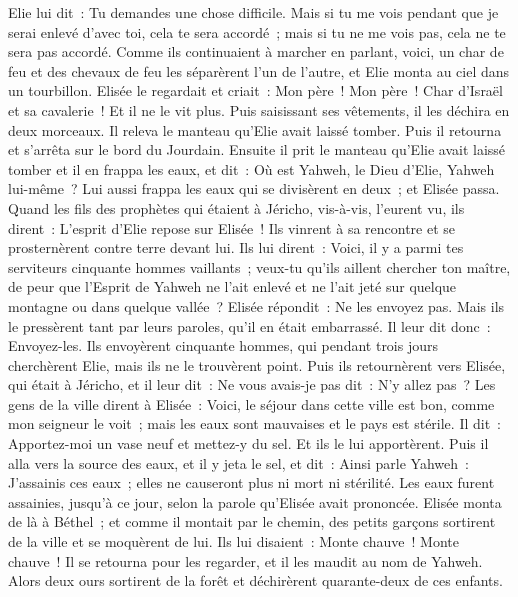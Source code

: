 \begin{multicols}{2}
Elie lui dit~: Tu demandes une chose difficile. Mais si tu me vois pendant que je serai enlevé d'avec toi, cela te sera accordé~; mais si tu ne me vois pas, cela ne te sera pas accordé.
Comme ils continuaient à marcher en parlant, voici, un char de feu et des chevaux de feu les séparèrent l'un de l'autre, et Elie monta au ciel dans un tourbillon.
Elisée le regardait et criait~: Mon père~! Mon père~! Char d'Israël et sa cavalerie~! Et il ne le vit plus. Puis saisissant ses vêtements, il les déchira en deux morceaux.
Il releva le manteau qu'Elie avait laissé tomber. Puis il retourna et s'arrêta sur le bord du Jourdain.
Ensuite il prit le manteau qu'Elie avait laissé tomber et il en frappa les eaux, et dit~: Où est Yahweh, le Dieu d'Elie, Yahweh lui-même~? Lui aussi frappa les eaux qui se divisèrent en deux~; et Elisée passa.
Quand les fils des prophètes qui étaient à Jéricho, vis-à-vis, l'eurent vu, ils dirent~: L'esprit d'Elie repose sur Elisée~! Ils vinrent à sa rencontre et se prosternèrent contre terre devant lui.
Ils lui dirent~: Voici, il y a parmi tes serviteurs cinquante hommes vaillants~; veux-tu qu'ils aillent chercher ton maître, de peur que l'Esprit de Yahweh ne l'ait enlevé et ne l'ait jeté sur quelque montagne ou dans quelque vallée~? Elisée répondit~: Ne les envoyez pas.
Mais ils le pressèrent tant par leurs paroles, qu'il en était embarrassé. Il leur dit donc~: Envoyez-les. Ils envoyèrent cinquante hommes, qui pendant trois jours cherchèrent Elie, mais ils ne le trouvèrent point.
Puis ils retournèrent vers Elisée, qui était à Jéricho, et il leur dit~: Ne vous avais-je pas dit~: N'y allez pas~?
Les gens de la ville dirent à Elisée~: Voici, le séjour dans cette ville est bon, comme mon seigneur le voit~; mais les eaux sont mauvaises et le pays est stérile.
Il dit~: Apportez-moi un vase neuf et mettez-y du sel. Et ils le lui apportèrent.
Puis il alla vers la source des eaux, et il y jeta le sel, et dit~: Ainsi parle Yahweh~: J'assainis ces eaux~; elles ne causeront plus ni mort ni stérilité.
Les eaux furent assainies, jusqu'à ce jour, selon la parole qu'Elisée avait prononcée.
Elisée monta de là à Béthel~; et comme il montait par le chemin, des petits garçons sortirent de la ville et se moquèrent de lui. Ils lui disaient~: Monte chauve~! Monte chauve~!
Il se retourna pour les regarder, et il les maudit au nom de Yahweh. Alors deux ours sortirent de la forêt et déchirèrent quarante-deux de ces enfants.

\end{multicols}
